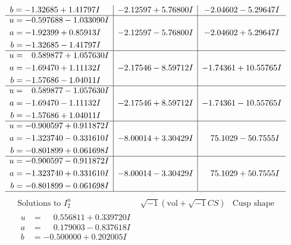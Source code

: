 \documentclass[1p]{elsarticle_modified}
\theoremstyle{definition}
\newcommand{\I}{\sqrt{-1}}
\begin{document}
$$\begin{array}{c|c|c}
\begin{aligned}
b &= -1.32685 + 1.41797 I\end{aligned}
 & -2.12597 + 5.76800 I & -2.04602 - 5.29647 I \\ \hline\begin{aligned}
u &= -0.597688 - 1.033090 I \\
a &= -1.92399 + 0.85913 I \\
b &= -1.32685 - 1.41797 I\end{aligned}
 & -2.12597 - 5.76800 I & -2.04602 + 5.29647 I \\ \hline\begin{aligned}
u &= \phantom{-}0.589877 + 1.057630 I \\
a &= -1.69470 + 1.11132 I \\
b &= -1.57686 - 1.04011 I\end{aligned}
 & -2.17546 - 8.59712 I & -1.74361 + 10.55765 I \\ \hline\begin{aligned}
u &= \phantom{-}0.589877 - 1.057630 I \\
a &= -1.69470 - 1.11132 I \\
b &= -1.57686 + 1.04011 I\end{aligned}
 & -2.17546 + 8.59712 I & -1.74361 - 10.55765 I \\ \hline\begin{aligned}
u &= -0.900597 + 0.911872 I \\
a &= -1.323740 - 0.331610 I \\
b &= -0.801899 + 0.061698 I\end{aligned}
 & -8.00014 + 3.30429 I & \phantom{-}75.1029 - 50.7555 I \\ \hline\begin{aligned}
u &= -0.900597 - 0.911872 I \\
a &= -1.323740 + 0.331610 I \\
b &= -0.801899 - 0.061698 I\end{aligned}
 & -8.00014 - 3.30429 I & \phantom{-}75.1029 + 50.7555 I\\
 \hline 
 \end{array}$$\newpage$$\begin{array}{c|c|c}  
\text{Solutions to }I^u_{2}& \I (\text{vol} + \sqrt{-1}CS) & \text{Cusp shape}\\
 \hline 
\begin{aligned}
u &= \phantom{-}0.556811 + 0.339720 I \\
a &= \phantom{-}0.179003 - 0.837618 I \\
b &= -0.500000 + 0.202005 I\end{aligned}

\end{array}$$
\end{document}
